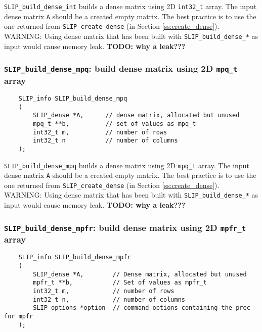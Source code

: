\documentclass[12pt]{article}
\theoremstyle{definition}
\begin{document}
\verb|SLIP_build_dense_int| builds a dense matrix using 2D \verb|int32_t|
array. The input dense matrix \verb|A| should be a created empty matrix.
The best practice is to use the one returned from \verb|SLIP_create_dense| (in
Section \ref{ss:create_dense}). WARNING: Using dense matrix that has been built
with \verb|SLIP_build_dense_*| as input would cause memory leak.
{\bf TODO: why a leak???} %

\cprotect\subsubsection{\verb|SLIP_build_dense_mpq|: build dense matrix using 2D \verb|mpq_t| array}
\label{s:user:build_dense_mpq}

\begin{mdframed}[userdefinedwidth=6in]
{\footnotesize
\begin{verbatim}
    SLIP_info SLIP_build_dense_mpq
    (
        SLIP_dense *A,      // dense matrix, allocated but unused
        mpq_t **b,          // set of values as mpq_t
        int32_t m,          // number of rows
        int32_t n           // number of columns
    );
\end{verbatim}
} \end{mdframed}

\verb|SLIP_build_dense_mpq| builds a dense matrix using 2D \verb|mpq_t| array.
The input dense matrix \verb|A| should be a created empty matrix. The
best practice is to use the one returned from \verb|SLIP_create_dense| (in
Section \ref{ss:create_dense}). WARNING: Using dense matrix that has been built
with \verb|SLIP_build_dense_*| as input would cause memory leak.
{\bf TODO: why a leak???} %

\cprotect\subsubsection{\verb|SLIP_build_dense_mpfr|: build dense matrix using 2D \verb|mpfr_t| array}
\label{s:user:build_dense_mpfr}

\begin{mdframed}[userdefinedwidth=6in]
{\footnotesize
\begin{verbatim}
    SLIP_info SLIP_build_dense_mpfr
    (
        SLIP_dense *A,        // Dense matrix, allocated but unused
        mpfr_t **b,           // Set of values as mpfr_t
        int32_t m,            // number of rows
        int32_t n,            // number of columns
        SLIP_options *option  // command options containing the prec for mpfr
    );
\end{verbatim}
} \end{mdframed}
\end{document}
